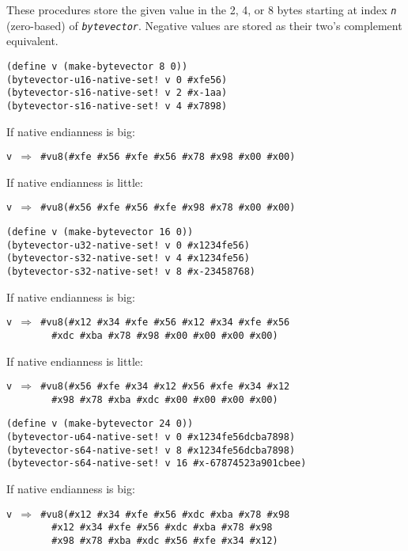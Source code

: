 These procedures store the given value in the 2, 4, or 8 bytes starting
at index \texttt{\textit{n}} (zero-based) of \texttt{\textit{bytevector}}.
Negative values are stored as their two's complement equivalent.


\begin{alltt}
(define v (make-bytevector 8 0))
(bytevector-u16-native-set! v 0 \#{}xfe56)
(bytevector-s16-native-set! v 2 \#{}x-1aa)
(bytevector-s16-native-set! v 4 \#{}x7898)
\end{alltt}


If native endianness is big:


\texttt{v \(\Rightarrow\) \#{}vu8(\#{}xfe \#{}x56 \#{}xfe \#{}x56 \#{}x78 \#{}x98 \#{}x00 \#{}x00)}

If native endianness is little:


\texttt{v \(\Rightarrow\) \#{}vu8(\#{}x56 \#{}xfe \#{}x56 \#{}xfe \#{}x98 \#{}x78 \#{}x00 \#{}x00)}

\begin{alltt}
(define v (make-bytevector 16 0))
(bytevector-u32-native-set! v 0 \#{}x1234fe56)
(bytevector-s32-native-set! v 4 \#{}x1234fe56)
(bytevector-s32-native-set! v 8 \#{}x-23458768)
\end{alltt}


If native endianness is big:


\begin{alltt}
v \(\Rightarrow\) \#{}vu8(\#{}x12 \#{}x34 \#{}xfe \#{}x56 \#{}x12 \#{}x34 \#{}xfe \#{}x56
        \#{}xdc \#{}xba \#{}x78 \#{}x98 \#{}x00 \#{}x00 \#{}x00 \#{}x00)
\end{alltt}


If native endianness is little:


\begin{alltt}
v \(\Rightarrow\) \#{}vu8(\#{}x56 \#{}xfe \#{}x34 \#{}x12 \#{}x56 \#{}xfe \#{}x34 \#{}x12
        \#{}x98 \#{}x78 \#{}xba \#{}xdc \#{}x00 \#{}x00 \#{}x00 \#{}x00)
\end{alltt}


\begin{alltt}
(define v (make-bytevector 24 0))
(bytevector-u64-native-set! v 0 \#{}x1234fe56dcba7898)
(bytevector-s64-native-set! v 8 \#{}x1234fe56dcba7898)
(bytevector-s64-native-set! v 16 \#{}x-67874523a901cbee)
\end{alltt}


If native endianness is big:


\begin{alltt}
v \(\Rightarrow\) \#{}vu8(\#{}x12 \#{}x34 \#{}xfe \#{}x56 \#{}xdc \#{}xba \#{}x78 \#{}x98
        \#{}x12 \#{}x34 \#{}xfe \#{}x56 \#{}xdc \#{}xba \#{}x78 \#{}x98
        \#{}x98 \#{}x78 \#{}xba \#{}xdc \#{}x56 \#{}xfe \#{}x34 \#{}x12)
\end{alltt}


